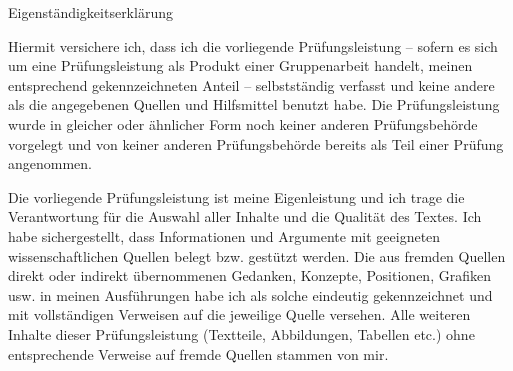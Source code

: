 %
%     
%


\clearpage
{}
\thispagestyle{empty}
\AddToShipoutPictureBG*{\ekLogoAudit}

\begingroup
\ekText
\vspace*{55pt}
{\color{UniVechtaRot}\fontsize{14pt}{17pt}\selectfont Eigenständigkeitserklärung\par}
\vspace{4.4pt}

Hiermit versichere ich, dass ich die vorliegende Prüfungsleistung – sofern es sich um eine Prüfungsleistung als Produkt einer Gruppenarbeit handelt, meinen entsprechend gekennzeichneten Anteil – selbstständig verfasst und keine andere als die angegebenen Quellen und Hilfsmittel benutzt habe. Die Prüfungsleistung wurde in gleicher oder ähnlicher Form noch keiner anderen Prüfungsbehörde vorgelegt und von keiner anderen Prüfungsbehörde bereits als Teil einer Prüfung angenommen.

Die vorliegende Prüfungsleistung ist meine Eigenleistung und ich trage die Verantwortung für die Auswahl aller Inhalte und die Qualität des Textes. Ich habe sichergestellt, dass Informationen und Argumente mit geeigneten wissenschaftlichen Quellen belegt bzw. gestützt werden. Die aus fremden Quellen direkt oder indirekt übernommenen Gedanken, Konzepte, Positionen, Grafiken usw. in meinen Ausführungen habe ich als solche eindeutig gekennzeichnet und mit vollständigen Verweisen auf die jeweilige Quelle versehen. Alle weiteren Inhalte dieser Prüfungsleistung (Textteile, Abbildungen, Tabellen etc.) ohne entsprechende Verweise auf fremde Quellen stammen von mir.


